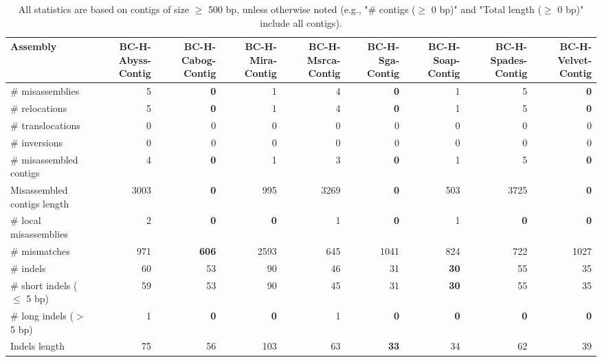 \documentclass[12pt,a4paper]{article}
\begin{document}
\begin{table}[ht]
\begin{center}
\caption{All statistics are based on contigs of size $\geq$ 500 bp, unless otherwise noted (e.g., "\# contigs ($\geq$ 0 bp)" and "Total length ($\geq$ 0 bp)" include all contigs).}
\begin{tabular}{|l*{8}{|r}|}
\hline
Assembly & BC-H-Abyss-Contig & BC-H-Cabog-Contig & BC-H-Mira-Contig & BC-H-Msrca-Contig & BC-H-Sga-Contig & BC-H-Soap-Contig & BC-H-Spades-Contig & BC-H-Velvet-Contig \\ \hline
\# misassemblies & 5 & {\bf 0} & 1 & 4 & {\bf 0} & 1 & 5 & {\bf 0} \\ \hline
\hspace{5mm}\# relocations & 5 & {\bf 0} & 1 & 4 & {\bf 0} & 1 & 5 & {\bf 0} \\ \hline
\hspace{5mm}\# translocations & 0 & 0 & 0 & 0 & 0 & 0 & 0 & 0 \\ \hline
\hspace{5mm}\# inversions & 0 & 0 & 0 & 0 & 0 & 0 & 0 & 0 \\ \hline
\# misassembled contigs & 4 & {\bf 0} & 1 & 3 & {\bf 0} & 1 & 5 & {\bf 0} \\ \hline
Misassembled contigs length & 3003 & {\bf 0} & 995 & 3269 & {\bf 0} & 503 & 3725 & {\bf 0} \\ \hline
\# local misassemblies & 2 & {\bf 0} & {\bf 0} & 1 & {\bf 0} & 1 & {\bf 0} & {\bf 0} \\ \hline
\# mismatches & 971 & {\bf 606} & 2593 & 645 & 1041 & 824 & 722 & 1027 \\ \hline
\# indels & 60 & 53 & 90 & 46 & 31 & {\bf 30} & 55 & 35 \\ \hline
\hspace{5mm}\# short indels ($\leq$ 5 bp) & 59 & 53 & 90 & 45 & 31 & {\bf 30} & 55 & 35 \\ \hline
\hspace{5mm}\# long indels ($>$ 5 bp) & 1 & {\bf 0} & {\bf 0} & 1 & {\bf 0} & {\bf 0} & {\bf 0} & {\bf 0} \\ \hline
Indels length & 75 & 56 & 103 & 63 & {\bf 33} & 34 & 62 & 39 \\ \hline
\end{tabular}
\end{center}
\end{table}
\end{document}
